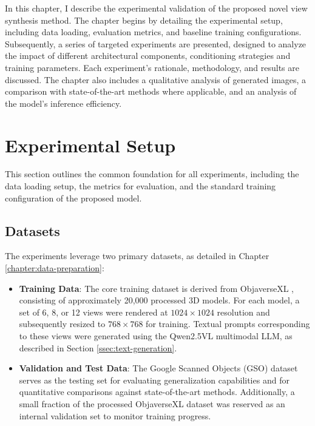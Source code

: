 \label{chapter:experiments}

In this chapter, I describe the experimental validation of the proposed novel view synthesis method. The chapter begins by detailing the experimental setup, including data loading, evaluation metrics, and baseline training configurations. Subsequently, a series of targeted experiments are presented, designed to analyze the impact of different architectural components, conditioning strategies and training parameters. Each experiment's rationale, methodology, and results are discussed. The chapter also includes a qualitative analysis of generated images, a comparison with state-of-the-art methods where applicable, and an analysis of the model's inference efficiency.

\section{Experimental Setup}\label{sec:exp_setup}

This section outlines the common foundation for all experiments, including the data loading setup, the metrics for evaluation, and the standard training configuration of the proposed model.

\subsection{Datasets}\label{ssec:exp_datasets}
The experiments leverage two primary datasets, as detailed in Chapter \ref{chapter:data-preparation}:
\begin{itemize}
  \item \textbf{Training Data}: The core training dataset is derived from ObjaverseXL \cite{objaversexl}, consisting of approximately 20,000 processed 3D models. For each model, a set of 6, 8, or 12 views were rendered at $1024 \times 1024$ resolution and subsequently resized to $768 \times 768$ for training. Textual prompts corresponding to these views were generated using the Qwen2.5VL multimodal LLM, as described in Section \ref{ssec:text-generation}.
  \item \textbf{Validation and Test Data}: The Google Scanned Objects (GSO) dataset \cite{gso} serves as the testing set for evaluating generalization capabilities and for quantitative comparisons against state-of-the-art methods. Additionally, a small fraction of the processed ObjaverseXL dataset was reserved as an internal validation set to monitor training progress.
\end{itemize}

